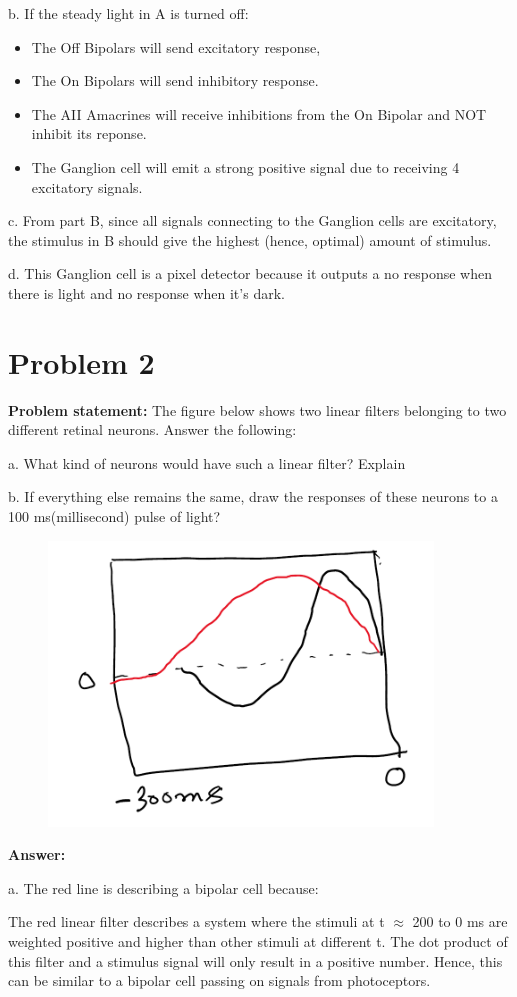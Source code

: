 \documentclass[letterpaper, 11pt]{article}
\begin{document}
b. If the steady light in A is turned off:
\begin{itemize}
	\item The Off Bipolars will send excitatory response,
	\item The On Bipolars will send inhibitory response.
	\item The AII Amacrines will receive inhibitions from the On Bipolar and NOT inhibit its reponse.
	\item The Ganglion cell will emit a strong positive signal due to receiving 4 excitatory signals.
\end{itemize}

c. From part B, since all signals connecting to the Ganglion cells are excitatory, the stimulus in B should give the highest (hence, optimal) amount of stimulus.

d. This Ganglion cell is a pixel detector because it outputs a no response when there is light and no response when it's dark.


\section{Problem 2}
\label{sec:prob2}
\textbf{Problem statement:} The figure below shows two linear filters belonging to two different retinal neurons. Answer the following: 

a. What kind of neurons would have such a linear filter? Explain

b. If everything else remains the same, draw the responses of these neurons to a 100 ms(millisecond) pulse of light?

\begin{figure}[htb!]
	\centering
	\includegraphics[width=0.5\linewidth]{fig2.png}
	\label{fig2}
\end{figure}

\textbf{Answer:}

a. The red line is describing a bipolar cell because:

The red linear filter describes a system where the stimuli at t $\approx$ 200 to 0 ms are weighted positive and higher than other stimuli at different t. The dot product of this filter and a stimulus signal will only result in a positive number. Hence, this can be similar to a bipolar cell passing on signals from photoceptors.
\end{document}

